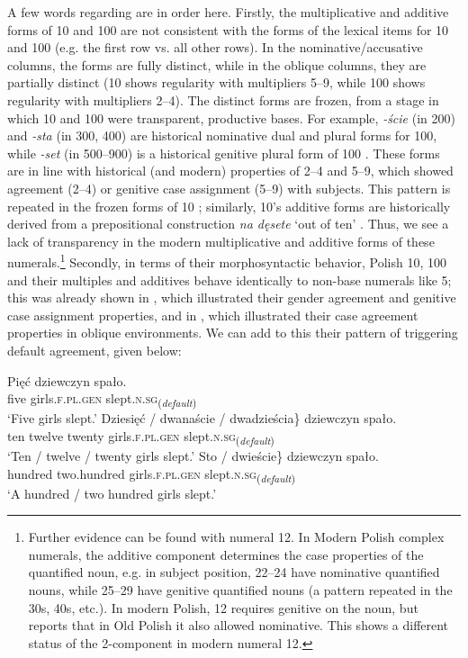 \documentclass[output=paper]{langscibook}
\begin{document}
A few words regarding  are in order here. Firstly, the multiplicative and additive forms of 10 and 100 are not consistent with the forms of the lexical items for 10 and 100 (e.g. the first row vs. all other rows). In the nominative/accusative columns, the forms are fully distinct, while in the oblique columns, they are partially distinct (10 shows regularity with multipliers 5--9, while 100 shows regularity with multipliers 2--4). The distinct forms are frozen, from a stage in which 10 and 100 were transparent, productive bases. For example, \textit{-ście} (in 200) and \textit{-sta} (in 300, 400) are historical nominative dual and plural forms for 100, while \textit{-set} (in 500--900) is a historical genitive plural form of 100 \citep{dziubala2014num}. These forms are in line with historical (and modern) properties of 2--4 and 5--9, which showed agreement (2--4) or genitive case assignment (5--9) with subjects. This pattern is repeated in the frozen forms of 10 \citep{miechowicz2014hist}; similarly, 10's additive forms are historically derived from a prepositional construction \textit{na dęsete} `out of ten' \citep[86]{dziubala2014num}. Thus, we see a lack of transparency in the modern multiplicative and additive forms of these numerals.\footnote{Further evidence can be found with numeral 12. In Modern Polish complex numerals, the additive component determines the case properties of the quantified noun, e.g. in subject position, 22--24 have nominative quantified nouns, while 25--29 have genitive quantified nouns (a pattern repeated in the 30s, 40s, etc.). In modern Polish, 12 requires genitive on the noun, but \cite[96--97]{dziubala2014num} reports that in Old Polish it also allowed nominative. This shows a different status of the 2-component in modern numeral 12.} 
Secondly, in terms of their morphosyntactic behavior, Polish 10, 100 and their multiples and additives behave identically to non-base numerals like 5; this was already shown in , which illustrated their gender agreement and genitive case assignment properties, and in , which illustrated their case agreement properties in oblique environments. We can add to this their pattern of triggering default agreement, given below:

\ea
\ea \gll Pięć dziewczyn spało.\\
five girls.\textsc{f.pl.gen} slept.\textsc{n.sg}\textsubscript{(\textit{default})}\\
\glt `Five girls slept.'
\ex \gll \minsp{\{} Dziesięć / dwanaście / dwadzieścia\} dziewczyn spało.\\
{} ten {} twelve {} twenty girls.\textsc{f.pl.gen} slept.\textsc{n.sg}\textsubscript{(\textit{default})}\\
\glt `Ten / twelve / twenty girls slept.' \label{klo:ex:defagr10}
\ex \gll \minsp{\{} Sto / dwieście\} dziewczyn spało.\\
{} hundred {} two.hundred girls.\textsc{f.pl.gen} slept.\textsc{n.sg}\textsubscript{(\textit{default})}\\
\glt `A hundred / two hundred girls slept.'
\z \z
\end{document}
